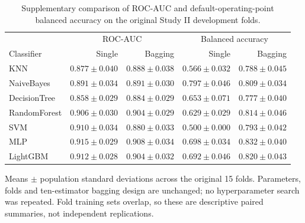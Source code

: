 \begin{table}[ht!]
\centering\small
\caption[BalancedBagging and ranking discrimination]{Supplementary comparison of ROC-AUC and default-operating-point balanced accuracy on the original Study II development folds.}
\label{tab:review_s2_bagging_auc}
\setlength{\tabcolsep}{4pt}
\begin{tabular}{lrrrr}
\toprule
 & \multicolumn{2}{c}{ROC-AUC} & \multicolumn{2}{c}{Balanced accuracy} \\
Classifier & Single & Bagging & Single & Bagging \\
\midrule
KNN & $0.877\pm0.040$ & $0.888\pm0.038$ & $0.566\pm0.032$ & $0.788\pm0.045$ \\
NaiveBayes & $0.891\pm0.034$ & $0.891\pm0.030$ & $0.797\pm0.046$ & $0.809\pm0.034$ \\
DecisionTree & $0.858\pm0.029$ & $0.884\pm0.029$ & $0.653\pm0.071$ & $0.777\pm0.040$ \\
RandomForest & $0.906\pm0.030$ & $0.904\pm0.029$ & $0.629\pm0.029$ & $0.814\pm0.046$ \\
SVM & $0.910\pm0.034$ & $0.880\pm0.033$ & $0.500\pm0.000$ & $0.793\pm0.042$ \\
MLP & $0.915\pm0.029$ & $0.908\pm0.034$ & $0.698\pm0.034$ & $0.832\pm0.040$ \\
LightGBM & $0.912\pm0.028$ & $0.904\pm0.032$ & $0.692\pm0.046$ & $0.820\pm0.043$ \\
\bottomrule\end{tabular}
\par\smallskip
\begin{minipage}{0.98\linewidth}\footnotesize
Means $\pm$ population standard deviations across the original 15 folds. Parameters, folds and ten-estimator bagging design are unchanged; no hyperparameter search was repeated. Fold training sets overlap, so these are descriptive paired summaries, not independent replications.
\end{minipage}
\end{table}
